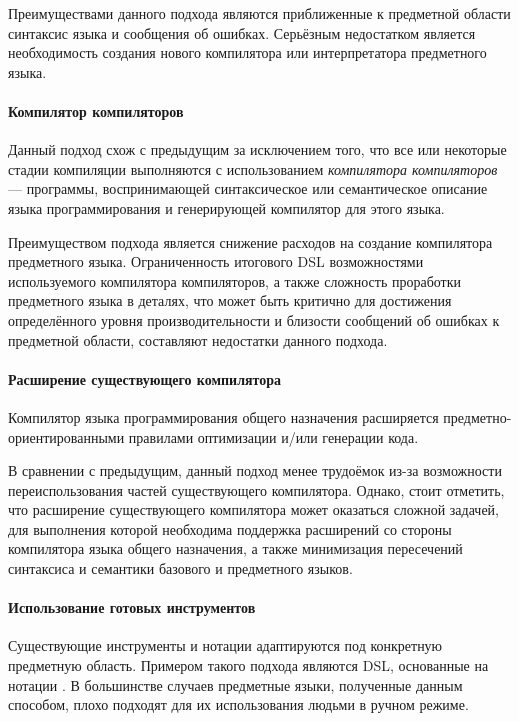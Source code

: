 Преимуществами данного подхода являются приближенные к предметной
области синтаксис языка и сообщения об ошибках. Серьёзным недостатком
является необходимость создания нового компилятора или интерпретатора
предметного языка.

\paragraph{Компилятор компиляторов}
Данный подход схож с предыдущим за исключением того, что все или некоторые
стадии компиляции выполняются с использованием \textit{компилятора компиляторов} --- программы, воспринимающей синтаксическое или семантическое
описание языка программирования и генерирующей компилятор для этого языка.

Преимуществом подхода является снижение расходов на создание компилятора
предметного языка. Ограниченность итогового DSL возможностями используемого
компилятора компиляторов, а также сложность проработки предметного языка в
деталях, что может быть критично для достижения определённого уровня
производительности и близости сообщений об ошибках к предметной области,
составляют недостатки данного подхода.

\paragraph{Расширение существующего компилятора}
Компилятор языка программирования общего назначения расширяется
предметно-ориенти\-рованными правилами оптимизации и/или генерации кода.

В сравнении с предыдущим, данный подход менее трудоёмок из-за возможности
переиспользования частей существующего компилятора. Однако, стоит отметить,
что расширение существующего компилятора может оказаться сложной задачей,
для выполнения которой необходима поддержка расширений со стороны
компилятора языка общего назначения, а также минимизация пересечений
синтаксиса и семантики базового и предметного языков.

\paragraph{Использование готовых инструментов}
Существующие инструменты и нотации адаптируются под конкретную предметную
область. Примером такого подхода являются DSL, основанные на нотации
. В большинстве случаев предметные языки, полученные данным
способом, плохо подходят для их использования людьми в ручном режиме.

